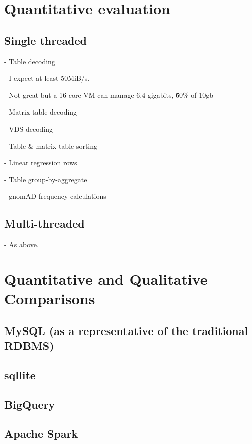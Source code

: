 \documentclass[10pt,a4paper%
]{article}
\begin{document}
\section{Quantitative evaluation}

\subsection{Single threaded}

    - Table decoding

      - I expect at least 50MiB/s.

      - Not great but a 16-core VM can manage 6.4 gigabits, \~60\% of 10gb

    - Matrix table decoding

    - VDS decoding

    - Table \& matrix table sorting

    - Linear regression rows

    - Table group-by-aggregate

    - gnomAD frequency calculations

\subsection{Multi-threaded}

    - As above.

\section{Quantitative and Qualitative Comparisons}

\subsection{MySQL (as a representative of the traditional RDBMS)}

\subsection{sqllite}

\subsection{BigQuery}

\subsection{Apache Spark}
\end{document}
